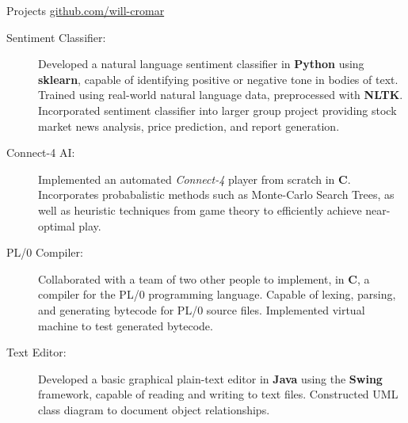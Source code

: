 \documentclass[letterpaper,11pt,oneside]{article}
\newcommand{\resheader}[2][]{
  \vspace{9pt}
  {\LARGE #2} #1
  \\
}
\newcommand{\ressubheader}[3][]{
  \vspace{6pt}
  {\large \textbf{#2} #1} \hfill \emph{#3}
  \\
}
\newcommand{\resskill}[1]{\textbf{#1}}
\begin{document}
\resheader[\hfill \url{github.com/will-cromar}]{Projects}
\begin{description}
  \item [Sentiment Classifier:] Developed a natural language
    sentiment classifier in \resskill{Python} using \resskill{sklearn}, capable
    of identifying positive or negative tone in bodies of text. Trained using
    real-world natural language data, preprocessed with \resskill{NLTK}.
    Incorporated sentiment classifier into larger group project providing stock
    market news analysis, price prediction, and report generation.
  \item [Connect-4 AI:] Implemented an automated \emph{Connect-4} player from
    scratch in \resskill{C}. Incorporates probabalistic methods such as
    Monte-Carlo Search Trees, as well as heuristic techniques from game theory
    to efficiently achieve near-optimal play.
  \item [PL/0 Compiler:] Collaborated with a team of two other people to
    implement, in \resskill{C}, a compiler for the PL/0 programming language.
    Capable of lexing, parsing, and generating bytecode for PL/0 source files.
    Implemented virtual machine to test generated bytecode.
  \item [Text Editor:] Developed a basic graphical plain-text editor in
    \resskill{Java} using the \resskill{Swing} framework, capable of reading and
    writing to text files. Constructed UML class diagram to document object
    relationships.
\end{description}    


\end{document}
